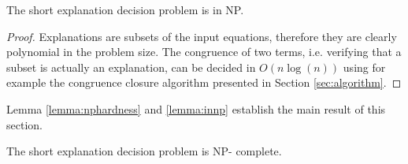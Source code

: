 \begin{lemma}[In NP]
\label{lemma:innp}
The short explanation decision problem is in NP.

\end{lemma}
\begin{proof}

Explanations are subsets of the input equations, therefore they are clearly polynomial in the problem size.
The congruence of two terms, i.e. verifying that a subset is actually an explanation, can be decided in $O(n \log(n))$ using for example the congruence closure algorithm presented in Section \ref{sec:algorithm}.

\end{proof}

Lemma \ref{lemma:nphardness} and \ref{lemma:innp} establish the main result of this section.

\begin{theorem}[NP - completeness]

The short explanation decision problem is NP- complete.

\end{theorem}